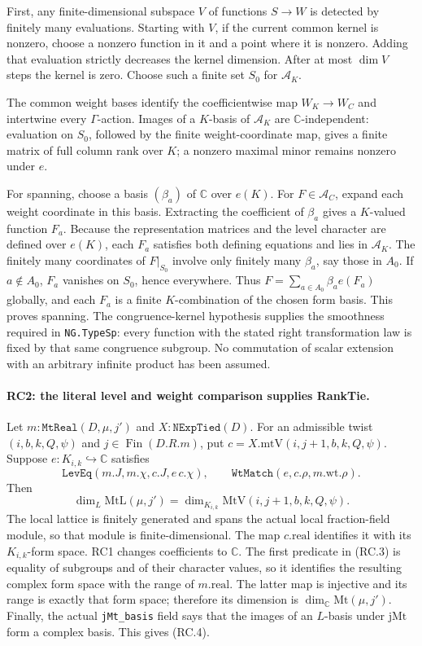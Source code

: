 First, any finite-dimensional subspace $V$ of functions $S\to W$ is
detected by finitely many evaluations. Starting with $V$, if the current
common kernel is nonzero, choose a nonzero function in it and a point where
it is nonzero. Adding that evaluation strictly decreases the kernel
dimension. After at most $\dim V$ steps the kernel is zero.
Choose such a finite set $S_0$ for $\mathcal A_K$.

The common weight bases identify the coefficientwise map
$W_K\to W_C$ and intertwine every $\Gamma$-action. Images of a $K$-basis
of $\mathcal A_K$ are $\mathbb C$-independent: evaluation on $S_0$, followed
by the finite weight-coordinate map, gives a finite matrix of full column
rank over $K$; a nonzero maximal minor remains nonzero under $e$.

For spanning, choose a basis $(\beta_a)$ of $\mathbb C$ over $e(K)$.
For $F\in\mathcal A_C$, expand each weight coordinate in this basis.
Extracting the coefficient of $\beta_a$ gives a $K$-valued function $F_a$.
Because the representation matrices and the level character are defined
over $e(K)$, each $F_a$ satisfies both defining equations and lies in
$\mathcal A_K$. The finitely many coordinates of $F|_{S_0}$ involve only
finitely many $\beta_a$, say those in $A_0$. If $a\notin A_0$, $F_a$ vanishes
on $S_0$, hence everywhere. Thus
$F=\sum_{a\in A_0}\beta_a e(F_a)$ globally, and each $F_a$ is a finite
$K$-combination of the chosen form basis. This proves spanning.
The congruence-kernel hypothesis supplies the smoothness required in
\texttt{NG.TypeSp}: every function with the stated right transformation
law is fixed by that same congruence subgroup. No commutation of scalar
extension with an arbitrary infinite product has been assumed.

\paragraph{RC2: the literal level and weight comparison supplies RankTie.}
Let $m:\texttt{MtReal}(D,\mu,j')$ and $X:\texttt{NExpTied}(D)$.
For an admissible twist $(i,b,k,Q,\psi)$ and $j\in\operatorname{Fin}(D.R.m)$,
put $c=X.\mathrm{mtV}(i,j+1,b,k,Q,\psi)$.
Suppose $e:K_{i,k}\hookrightarrow\mathbb C$ satisfies
\[
 \texttt{LevEq}(m.J,m.\chi,c.J,e\,c.\chi),\qquad
 \texttt{WtMatch}(e,c.\rho,m.\mathrm{wt}.\rho).
                                                               \tag{RC.3}
\]
Then
\[
 \dim_L \mathrm{MtL}(\mu,j')
 =\dim_{K_{i,k}}\mathrm{MtV}(i,j+1,b,k,Q,\psi).             \tag{RC.4}
\]
The local lattice is finitely generated and spans the actual local
fraction-field module, so that module is finite-dimensional.
The map $c.\mathrm{real}$ identifies it with its $K_{i,k}$-form space.
RC1 changes coefficients to $\mathbb C$. The first predicate in (RC.3)
is equality of subgroups and of their character values, so it identifies
the resulting complex form space with the range of $m.\mathrm{real}$.
The latter map is injective and its range is exactly that form space;
therefore its dimension is $\dim_{\mathbb C}\mathrm{Mt}(\mu,j')$.
Finally, the actual \texttt{jMt\_basis} field says that the images of an
$L$-basis under $\mathrm{jMt}$ form a complex basis. This gives (RC.4).

